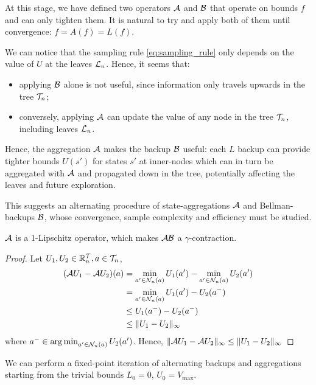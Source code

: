 \documentclass{article}
\begin{document}
At this stage, we have defined two operators $\mathcal{A}$ and $\mathcal{B}$ that operate on bounds $f$ and can only tighten them. It is natural to try and apply both of them until convergence: $f = A(f) = L(f)$.


\begin{remark}
We can notice that the sampling rule \eqref{eq:sampling_rule} only depends on the value of $U$ at the leaves $\mathcal{L}_n$. Hence, it seems that:
\begin{itemize}
    \item applying $\mathcal{B}$ alone is not useful, since information only travels upwards in the tree $\mathcal{T}_n$;
    \item conversely, applying $\mathcal{A}$ can update the value of any node in the tree $\mathcal{T}_n$, including leaves $\mathcal{L}_n$.
\end{itemize}
Hence, the aggregation $\mathcal{A}$ makes the backup $\mathcal{B}$ useful: each $L$ backup can provide tighter bounds $U(s')$ for states $s'$ at inner-nodes which can in turn be aggregated with $\mathcal{A}$ and propagated down in the tree, potentially affecting the leaves and future exploration. 
\end{remark}

This suggests an alternating procedure of state-aggregations $\mathcal{A}$ and Bellman-backups $\mathcal{B}$, whose convergence, sample complexity and efficiency must be studied.

\begin{proposition}[Contractivity of $\cA\cB$] $\mathcal{A}$ is a 1-Lipschitz operator, which makes $\cA\cB$ a $\gamma$-contraction.
\end{proposition}
\begin{proof}
Let $U_1, U_2\in \mathbb{R}^{\mathcal{T}}_n, a\in\mathcal{T}_n$,
\begin{align*}
    (\mathcal{A} U_1 - \mathcal{A} U_2)(a) &= \min_{a'\in\mathcal{N}_n(a)} U_1(a') - \min_{a'\in\mathcal{N}_n(a)} U_2(a') \\
    &= \min_{a'\in\mathcal{N}_n(a)} U_1(a') - U_2(a^-) \\
    &\leq U_1(a^-) - U_2(a^-) \\
    &\leq \|U_1 - U_2\|_\infty
\end{align*}
where $a^-\in \operatorname*{arg\,min}_{a'\in\mathcal{N}_n(a)} U_2(a')$. 
Hence, $\|\mathcal{A} U_1 - \mathcal{A} U_2\|_\infty \leq \|U_1 - U_2\|_\infty$
\end{proof}

We can perform a fixed-point iteration of alternating backups and aggregations starting from the trivial bounds $L_0=0$, $U_0 = V_{\max}$.
\end{document}

